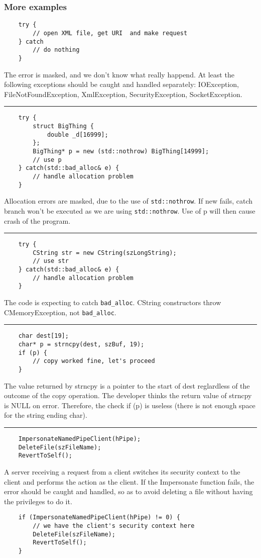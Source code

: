 \documentclass[a4paper, 10pt, titlepage]{article}
\begin{document}
\subsubsection*{More examples}
\begin{lstlisting}
	try {
		// open XML file, get URI  and make request
	} catch
		// do nothing
	}
\end{lstlisting}
The error is masked, and we don’t know what really happend. At least the following exceptions should be caught and handled separately:
IOException, FileNotFoundException, XmlException, SecurityException, SocketException.
\\\noindent\rule{10cm}{0.4pt}
\begin{lstlisting}
	try {
		struct BigThing {
			double _d[16999];
		};
		BigThing* p = new (std::nothrow) BigThing[14999];
		// use p
	} catch(std::bad_alloc& e) {
		// handle allocation problem
	}
\end{lstlisting}
Allocation errors are masked, due to the use of \lstinline|std::nothrow|. If new fails, catch branch won't be executed as we are using \lstinline|std::nothrow|. Use of p will then cause crash of the program.
\\\noindent\rule{10cm}{0.4pt}
\begin{lstlisting}
	try {
		CString str = new CString(szLongString);
		// use str
	} catch(std::bad_alloc& e) {
		// handle allocation problem
	}
\end{lstlisting}
The code is expecting to catch \lstinline|bad_alloc|. CString constructors throw CMemoryException, not \lstinline|bad_alloc|.
\\\noindent\rule{10cm}{0.4pt}
\begin{lstlisting}
	char dest[19];
	char* p = strncpy(dest, szBuf, 19);
	if (p) {
		// copy worked fine, let's proceed
	}
\end{lstlisting}
The value returned by strncpy is a pointer to the start of dest
reglardless of the outcome of the copy operation. The developer thinks the return value of strncpy is NULL on error. Therefore, the check if (p) is useless (there is not enough space for the string ending char).
\\\noindent\rule{10cm}{0.4pt}
\begin{lstlisting}
	ImpersonateNamedPipeClient(hPipe);
	DeleteFile(szFileName);
	RevertToSelf();
\end{lstlisting}
A server receiving a request from a client switches its security context to the client and performs the action as the client. If the Impersonate function fails, the error should be caught and handled, so as to avoid deleting a file without having the privileges to do it.
\begin{lstlisting}
	if (ImpersonateNamedPipeClient(hPipe) != 0) {
		// we have the client's security context here
		DeleteFile(szFileName);
		RevertToSelf();
	}
\end{lstlisting}
\end{document}
